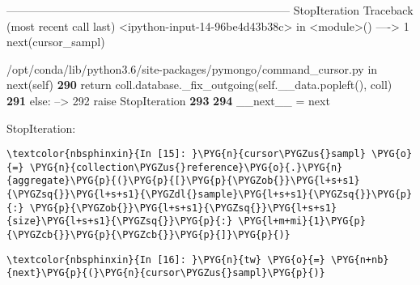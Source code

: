 \documentclass[letterpaper,10pt,english]{sphinxmanual}
\begin{document}
%
\begin{OriginalVerbatim}[commandchars=\\\{\}]
\textcolor{ansi-red}{---------------------------------------------------------------------------}
\textcolor{ansi-red}{StopIteration}                             Traceback (most recent call last)
\textcolor{ansi-green}{<ipython-input-14-96be4d43b38c>} in \textcolor{ansi-cyan}{<module>}\textcolor{ansi-blue}{()}
\textcolor{ansi-green}{----> 1}\textcolor{ansi-red}{ }next\textcolor{ansi-blue}{(}cursor\_sampl\textcolor{ansi-blue}{)}

\textcolor{ansi-green}{/opt/conda/lib/python3.6/site-packages/pymongo/command\_cursor.py} in \textcolor{ansi-cyan}{next}\textcolor{ansi-blue}{(self)}
\textcolor{ansi-green-intense}{\textbf{    290}}             \textcolor{ansi-green}{return} coll\textcolor{ansi-blue}{.}database\textcolor{ansi-blue}{.}\_fix\_outgoing\textcolor{ansi-blue}{(}self\textcolor{ansi-blue}{.}\_\_data\textcolor{ansi-blue}{.}popleft\textcolor{ansi-blue}{(}\textcolor{ansi-blue}{)}\textcolor{ansi-blue}{,} coll\textcolor{ansi-blue}{)}
\textcolor{ansi-green-intense}{\textbf{    291}}         \textcolor{ansi-green}{else}\textcolor{ansi-blue}{:}
\textcolor{ansi-green}{--> 292}\textcolor{ansi-red}{             }\textcolor{ansi-green}{raise} StopIteration
\textcolor{ansi-green-intense}{\textbf{    293}}
\textcolor{ansi-green-intense}{\textbf{    294}}     \_\_next\_\_ \textcolor{ansi-blue}{=} next

\textcolor{ansi-red}{StopIteration}:
\end{OriginalVerbatim}
\relax

%
\begin{Verbatim}[commandchars=\\\{\}]
\textcolor{nbsphinxin}{In [15]: }\PYG{n}{cursor\PYGZus{}sampl} \PYG{o}{=} \PYG{n}{collection\PYGZus{}reference}\PYG{o}{.}\PYG{n}{aggregate}\PYG{p}{(}\PYG{p}{[}\PYG{p}{\PYGZob{}}\PYG{l+s+s1}{\PYGZsq{}}\PYG{l+s+s1}{\PYGZdl{}sample}\PYG{l+s+s1}{\PYGZsq{}}\PYG{p}{:} \PYG{p}{\PYGZob{}}\PYG{l+s+s1}{\PYGZsq{}}\PYG{l+s+s1}{size}\PYG{l+s+s1}{\PYGZsq{}}\PYG{p}{:} \PYG{l+m+mi}{1}\PYG{p}{\PYGZcb{}}\PYG{p}{\PYGZcb{}}\PYG{p}{]}\PYG{p}{)}
\end{Verbatim}

%
\begin{Verbatim}[commandchars=\\\{\}]
\textcolor{nbsphinxin}{In [16]: }\PYG{n}{tw} \PYG{o}{=} \PYG{n+nb}{next}\PYG{p}{(}\PYG{n}{cursor\PYGZus{}sampl}\PYG{p}{)}
\end{Verbatim}
\end{document}
